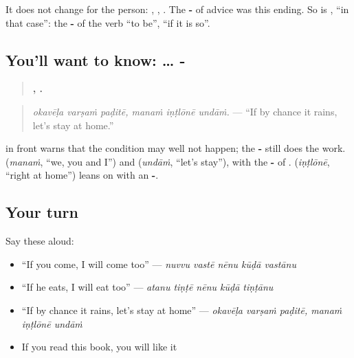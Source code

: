 It does not change for the person: \textbf{ }, \textbf{ }, \textbf{ }. The \textbf{- } of advice was this ending. So is \textbf{}, \textquotedblleft{}in that case\textquotedblright{}: the \textbf{-} of the verb \textquotedblleft{}to be\textquotedblright{}, \textquotedblleft{}if it is so\textquotedblright{}.

\subsection*{You'll want to know:  … -}
\begin{quote}
\textbf{  ,   .}
\end{quote}

\begin{quote}
\emph{okavēḷa varṣaṁ paḍitē, manaṁ iṇṭlōnē undāṁ.} — \textquotedblleft{}If by chance it rains, let's stay at home.\textquotedblright{}
\end{quote}

\textbf{} in front warns that the condition may well not happen; the \textbf{-} still does the work. \textbf{} (\emph{manaṁ}, \textquotedblleft{}we, you and I\textquotedblright{}) and \textbf{} (\emph{undāṁ}, \textquotedblleft{}let's stay\textquotedblright{}), with the \textbf{-} of \textbf{}. \textbf{} (\emph{iṇṭlōnē}, \textquotedblleft{}right at home\textquotedblright{}) leans on \textbf{} with an \textbf{-}.

\subsection*{Your turn}
Say these aloud:

\begin{itemize}
\raggedright
  \item \textquotedblleft{}If you come, I will come too\textquotedblright{} — \emph{nuvvu vastē nēnu kūḍā vastānu}
  \item \textquotedblleft{}If he eats, I will eat too\textquotedblright{} — \emph{atanu tiṇṭē nēnu kūḍā tiṇṭānu}
  \item \textquotedblleft{}If by chance it rains, let's stay at home\textquotedblright{} — \emph{okavēḷa varṣaṁ paḍitē, manaṁ iṇṭlōnē undāṁ}
  \item If you read this book, you will like it
\end{itemize}

